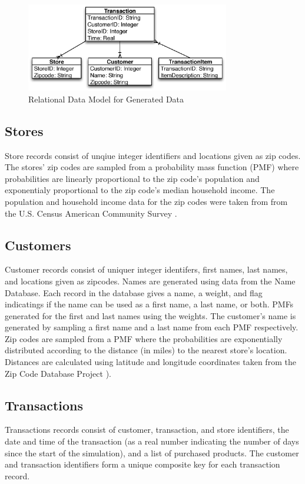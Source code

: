 \documentclass[conference]{IEEEtran}
\begin{document}
\begin{figure}[!t]
  \centering
  \includegraphics[width=3.5in]{figures/transactions_data_model.eps}
  \caption{Relational Data Model for Generated Data}
  \label{fig:relational-data-model}
\end{figure}


\subsection{Stores}
Store records consist of unqiue integer identifiers and locations given as zip codes.  The stores' zip codes are sampled from a probability mass function (PMF) where probabilities are linearly proportional to the zip code's population and exponentialy proportional to the zip code's median household income. The population and household income data for the zip codes were taken from from the U.S. Census American Community Survey \cite{ACS}.

\subsection{Customers}
Customer records consist of uniquer integer identifers, first names, last names, and locations given as zipcodes.  Names are generated using data from the Name Database\cite{NameDB}. Each record in the database gives a name, a weight, and flag indicatings if the name can be used as a first name, a last name, or both.  PMFs generated for the first and last names using the weights.  The customer's name is generated by sampling a first name and a last name from each PMF respectively.  Zip codes are sampled from a PMF where the probabilities are exponentially distributed according to the distance (in miles) to the nearest store's location. Distances are calculated using latitude and longitude coordinates taken from the Zip Code Database Project \cite{Zips}).

\subsection{Transactions}
Transactions records consist of customer, transaction, and store identifiers, the date and time of the transaction (as a real number indicating the number of days since the start of the simulation), and a list of purchased products. The customer and transaction identifiers form a unique composite key for each transaction record.
\end{document}
